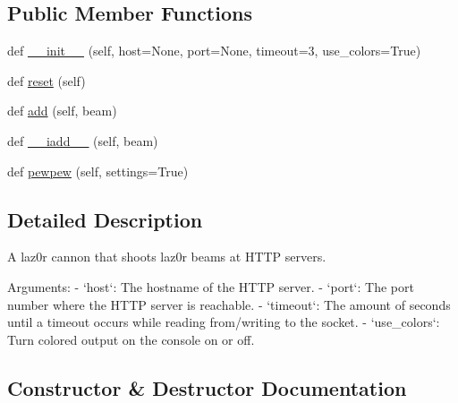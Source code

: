 \subsection*{Public Member Functions}
\begin{DoxyCompactItemize}
\item 
def \hyperlink{classpewpewlaz0rt4nk_1_1_laz0r_cannon_a3dd756910e3c6b07498f060bdf0b417e}{\+\_\+\+\_\+init\+\_\+\+\_\+} (self, host=None, port=None, timeout=3, use\+\_\+colors=True)
\item 
def \hyperlink{classpewpewlaz0rt4nk_1_1_laz0r_cannon_a51829b63adb24ac48d350dee60181002}{reset} (self)
\item 
def \hyperlink{classpewpewlaz0rt4nk_1_1_laz0r_cannon_a95d2c7f7c4173d33f1a2b9f70544f6fb}{add} (self, beam)
\item 
def \hyperlink{classpewpewlaz0rt4nk_1_1_laz0r_cannon_ada8f9d781d3eb083a027b074306d85db}{\+\_\+\+\_\+iadd\+\_\+\+\_\+} (self, beam)
\item 
def \hyperlink{classpewpewlaz0rt4nk_1_1_laz0r_cannon_a602db2841c236b79433716f61c5e2d01}{pewpew} (self, settings=True)
\end{DoxyCompactItemize}


\subsection{Detailed Description}
\begin{DoxyVerb}A laz0r cannon that shoots laz0r beams at HTTP servers.

Arguments:
    - `host`: The hostname of the HTTP server.
    - `port`: The port number where the HTTP server is reachable.
    - `timeout`: The amount of seconds until a timeout occurs while
      reading from/writing to the socket.
    - `use_colors`: Turn colored output on the console on or off.
\end{DoxyVerb}
 

\subsection{Constructor \& Destructor Documentation}
\mbox{\label{classpewpewlaz0rt4nk_1_1_laz0r_cannon_a3dd756910e3c6b07498f060bdf0b417e}} 

